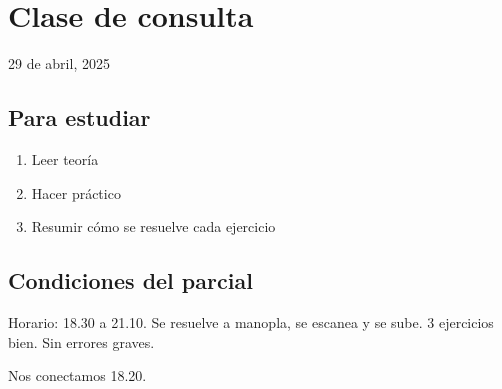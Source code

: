 \section{Clase de consulta}

29 de abril, 2025

\subsection{Para estudiar}

\begin{enumerate}
    \item Leer teoría
    \item Hacer práctico
    \item Resumir cómo se resuelve cada ejercicio
\end{enumerate}

\subsection{Condiciones del parcial}

Horario: 18.30 a 21.10.
Se resuelve a manopla, se escanea y se sube.
3 ejercicios bien.
Sin errores graves.

Nos conectamos 18.20.